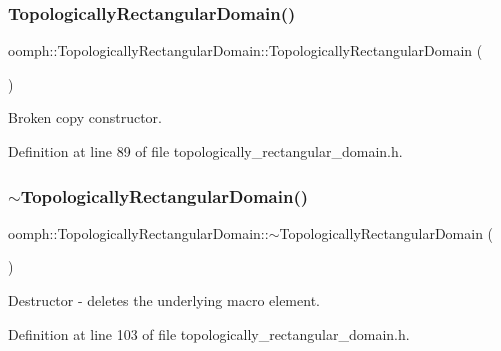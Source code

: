 \subsubsection{\texorpdfstring{Topologically\+Rectangular\+Domain()}{TopologicallyRectangularDomain()}\hspace{0.1cm}{\footnotesize\ttfamily [4/4]}}
{\footnotesize\ttfamily oomph\+::\+Topologically\+Rectangular\+Domain\+::\+Topologically\+Rectangular\+Domain (\begin{DoxyParamCaption}\item[{const \hyperlink{classoomph_1_1TopologicallyRectangularDomain}{Topologically\+Rectangular\+Domain} \&}]{ }\end{DoxyParamCaption})\hspace{0.3cm}{\ttfamily [inline]}}



Broken copy constructor. 



Definition at line 89 of file topologically\+\_\+rectangular\+\_\+domain.\+h.

\mbox{\label{classoomph_1_1TopologicallyRectangularDomain_aa7b1e4911a2b0ac8f599819faa2c9b27}} 
\subsubsection{\texorpdfstring{$\sim$\+Topologically\+Rectangular\+Domain()}{~TopologicallyRectangularDomain()}}
{\footnotesize\ttfamily oomph\+::\+Topologically\+Rectangular\+Domain\+::$\sim$\+Topologically\+Rectangular\+Domain (\begin{DoxyParamCaption}{ }\end{DoxyParamCaption})\hspace{0.3cm}{\ttfamily [inline]}}



Destructor -\/ deletes the underlying macro element. 



Definition at line 103 of file topologically\+\_\+rectangular\+\_\+domain.\+h.



